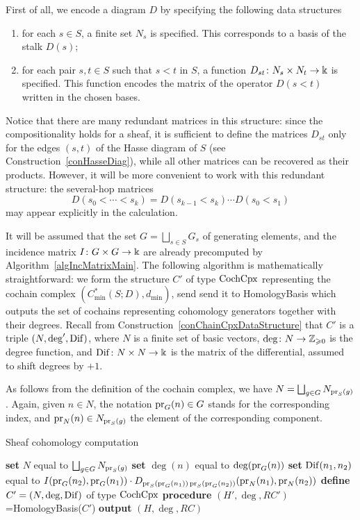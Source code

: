 \begin{con}
First of all, we encode a diagram $D$ by specifying the following data structures
\begin{enumerate}
  \item for each $s\in S$, a finite set $N_s$ is specified. This corresponds to a basis of the stalk $D(s)$;
  \item for each pair $s,t\in S$ such that $s<t$ in $S$, a function $D_{st}\colon N_s\times N_t\to \Bbbk$ is specified. This function encodes the matrix of the operator $D(s<t)$ written in the chosen bases.
\end{enumerate}
Notice that there are many redundant matrices in this structure: since the compositionality holds for a sheaf, it is sufficient to define the matrices $D_{st}$ only for the edges $(s,t)$ of the Hasse diagram of $S$ (see Construction~\ref{conHasseDiag}), while all other matrices can be recovered as their products. However, it will be more convenient to work with this redundant structure: the several-hop matrices
\[
D(s_0<\cdots<s_k)=D(s_{k-1}<s_k)\cdots D(s_0<s_1)
\]
may appear explicitly in the calculation.
\end{con}

It will be assumed that the set $G=\bigsqcup_{s\in S}G_s$ of generating elements, and the incidence matrix $I\colon G\times G\to\Bbbk$ are already precomputed by Algorithm~\ref{algIncMatrixMain}. The following algorithm is mathematically straightforward: we form the structure $C'$ of type $\operatorname{CochCpx}$ representing the cochain complex $(C^*_{\min}(S;D),d_{\min})$, send send it to HomologyBasis which outputs the set of cochains representing cohomology generators together with their degrees. Recall from Construction~\ref{conChainCpxDataStructure} that $C'$ is a triple $(N,\deg',\operatorname{Dif})$, where $N$ is a finite set of basic vectors, $\deg\colon N\to\mathbb{Z}_{\geqslant 0}$ is the degree function, and $\operatorname{Dif}\colon N\times N\to \Bbbk$ is the matrix of the differential, assumed to shift degrees by $+1$.

As follows from the definition of the cochain complex, we have $N=\bigsqcup_{g\in G}N_{\operatorname{pr}_S(g)}$. Again, given $n\in N$, the notation $\operatorname{pr}_G(n)\in G$ stands for the corresponding index, and $\operatorname{pr}_N(n)\in N_{\operatorname{pr}_S(g)}$ the element of the corresponding component.

\begin{algorithm}
    \caption{Sheaf cohomology computation}\label{algMainAlg}
    \begin{algorithmic}[1]
    \STATE \textbf{set} $N$ equal to $\bigsqcup_{g\in G}N_{\operatorname{pr}_S(g)}$
        \STATE \textbf{set} $\deg(n)$ equal to $\deg(\operatorname{pr}_G(n))$
    \ENDFOR
        \STATE \textbf{set} $\operatorname{Dif}(n_1,n_2)$ equal to $I(\operatorname{pr}_G(n_2),\operatorname{pr}_G(n_1))\cdot D_{\operatorname{pr}_S(\operatorname{pr}_G(n_1))\operatorname{pr}_S(\operatorname{pr}_G(n_2))}(\operatorname{pr}_N(n_1),\operatorname{pr}_N(n_2))$
    \ENDFOR
    \STATE \textbf{define} $C'=(N,\deg,\operatorname{Dif})$ of type $\operatorname{CochCpx}$
    \STATE \textbf{procedure} $(H',\deg,RC')$=HomologyBasis($C'$)
    \STATE \textbf{output} $(H,\deg,RC)$
    \end{algorithmic}
\end{algorithm}

